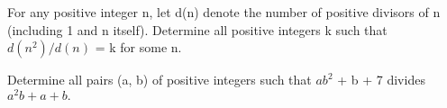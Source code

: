 
\item For any positive integer n, let d(n) denote the number of positive divisors of n (including 1 and n itself). Determine all positive integers k such that $d(n^2)/d(n)$ = k for some n.\\

\item Determine all pairs (a, b) of positive integers such that $ab^2$ + b + 7 divides $a^2b + a + b.$



